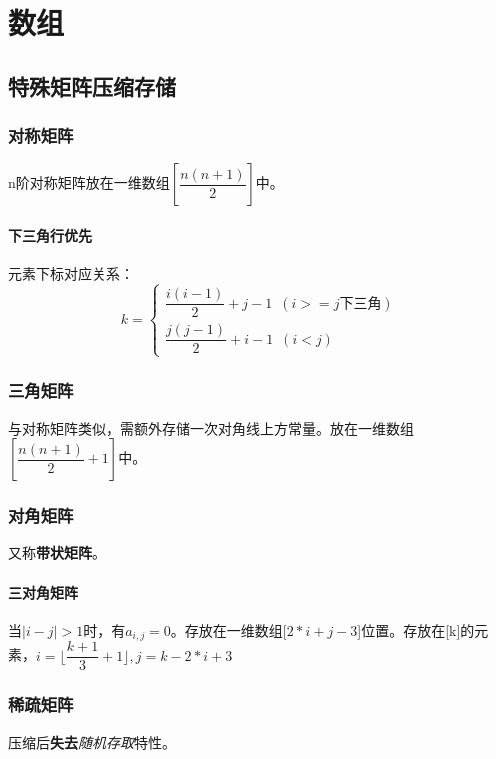 
\chapter{数组}

\section{特殊矩阵压缩存储}

\subsection{对称矩阵}
n阶对称矩阵放在一维数组\([\dfrac{n(n + 1)}{2}]\)中。

\subsubsection{下三角行优先}
元素下标对应关系：
\[k = \begin{cases}
    \dfrac{i(i - 1)}{2} + j - 1\,\,\,(i >= j\text{下三角}) \\
    \dfrac{j(j - 1)}{2} + i - 1\,\,\,(i < j)
\end{cases}\]


\subsection{三角矩阵}
与对称矩阵类似，需额外存储一次对角线上方常量。放在一维数组\([\dfrac{n(n + 1)}{2} + 1]\)中。


\subsection{对角矩阵}
又称\textbf{带状矩阵}。

\subsubsection{三对角矩阵}
当\(|i - j| > 1\)时，有\(a_{i, j} = 0\)。存放在一维数组[\(2 * i + j - 3\)]位置。存放在[k]的元素，\(i = \lfloor\dfrac{k + 1}{3} + 1\rfloor, j = k - 2 * i + 3\)


\subsection{稀疏矩阵}
压缩后\textbf{失去}\textit{随机存取}特性。

